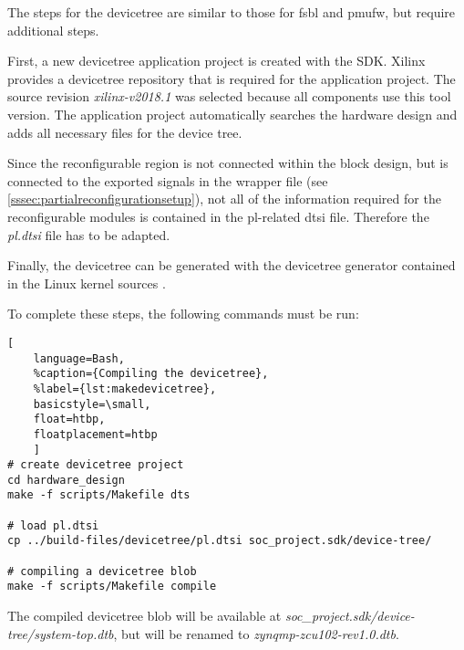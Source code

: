 The steps for the devicetree are similar to those for \gls{fsbl} and \gls{pmufw}, but require additional steps.

First, a new devicetree application project is created with the SDK. Xilinx provides a devicetree repository \cite{devicetree} that is required for the application project. The source revision \emph{xilinx-v2018.1} was selected because all components use this tool version. The application project automatically searches the hardware design and adds all necessary files for the device tree.

Since the reconfigurable region is not connected within the block design, but is connected to the exported signals in the wrapper file (see \cref{sssec:partialreconfigurationsetup}), not all of the information required for the reconfigurable modules is contained in the \gls{pl}-related \gls{dtsi} file. Therefore the \emph{pl.dtsi} file has to be adapted.

Finally, the devicetree can be generated with the devicetree generator contained in the Linux kernel sources \cite{linuxkernel}.

To complete these steps, the following commands must be run:
\begin{lstlisting}[
	language=Bash,
	%caption={Compiling the devicetree},
	%label={lst:makedevicetree},
	basicstyle=\small,
	float=htbp,
	floatplacement=htbp
	]
# create devicetree project
cd hardware_design
make -f scripts/Makefile dts

# load pl.dtsi
cp ../build-files/devicetree/pl.dtsi soc_project.sdk/device-tree/

# compiling a devicetree blob
make -f scripts/Makefile compile
\end{lstlisting}

The compiled devicetree blob will be available at \emph{soc_project.sdk/device-tree/system-top.dtb}, but will be renamed to \emph{zynqmp-zcu102-rev1.0.dtb}.